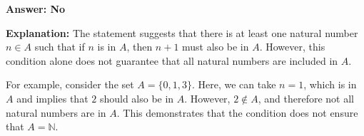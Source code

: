 \documentclass{article}
\begin{document}
\textbf{Answer: No}

\textbf{Explanation:} The statement suggests that there is at least one natural number \( n \in A \) such that if \( n \) is in \( A \), then \( n + 1 \) must also be in \( A \). However, this condition alone does not guarantee that all natural numbers are included in \( A \).

For example, consider the set \( A = \{0, 1, 3\} \). Here, we can take \( n = 1 \), which is in \( A \) and implies that \( 2 \) should also be in \( A \). However, \( 2 \notin A \), and therefore not all natural numbers are in \( A \). This demonstrates that the condition does not ensure that \( A = \mathbb{N} \).
\end{document}

